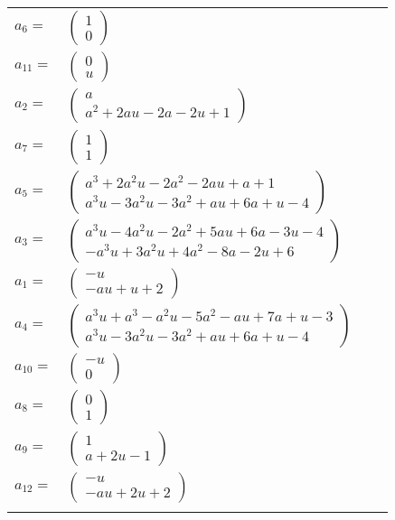 \documentclass[1p]{elsarticle_modified}
\theoremstyle{definition}
\begin{document}
\begin{tabular}{m{7pt} m{180pt} m{7pt} m{180pt} }
\flushright $a_{6}=$&$\begin{pmatrix}1\\0\end{pmatrix}$ \\
\flushright $a_{11}=$&$\begin{pmatrix}0\\u\end{pmatrix}$ \\
\flushright $a_{2}=$&$\begin{pmatrix}a\\a^2+2 a u-2 a-2 u+1\end{pmatrix}$ \\
\flushright $a_{7}=$&$\begin{pmatrix}1\\1\end{pmatrix}$ \\
\flushright $a_{5}=$&$\begin{pmatrix}a^3+2 a^2 u-2 a^2-2 a u+a+1\\a^3 u-3 a^2 u-3 a^2+a u+6 a+u-4\end{pmatrix}$ \\
\flushright $a_{3}=$&$\begin{pmatrix}a^3 u-4 a^2 u-2 a^2+5 a u+6 a-3 u-4\\- a^3 u+3 a^2 u+4 a^2-8 a-2 u+6\end{pmatrix}$ \\
\flushright $a_{1}=$&$\begin{pmatrix}- u\\- a u+u+2\end{pmatrix}$ \\
\flushright $a_{4}=$&$\begin{pmatrix}a^3 u+a^3- a^2 u-5 a^2- a u+7 a+u-3\\a^3 u-3 a^2 u-3 a^2+a u+6 a+u-4\end{pmatrix}$ \\
\flushright $a_{10}=$&$\begin{pmatrix}- u\\0\end{pmatrix}$ \\
\flushright $a_{8}=$&$\begin{pmatrix}0\\1\end{pmatrix}$ \\
\flushright $a_{9}=$&$\begin{pmatrix}1\\a+2 u-1\end{pmatrix}$ \\
\flushright $a_{12}=$&$\begin{pmatrix}- u\\- a u+2 u+2\end{pmatrix}$\\&\end{tabular}
\end{document}
